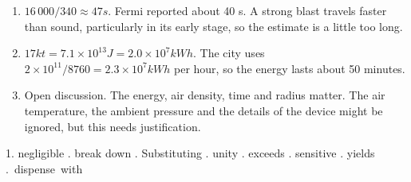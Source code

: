 \documentclass[11pt,a4paper]{article}
\begin{document}
\clearpage
{}

\begin{enumerate}[label=\textbf{\arabic*.}]
  \item $16\,000/340\approx47\unit{s}$. Fermi reported about 40 s. A strong blast travels faster than sound, particularly in its early stage, so the estimate is a little too long.\\
  \item $17\unit{kt}=7.1\times10^{13}\unit{J}=2.0\times10^{7}\unit{kWh}$. The city uses $2\times10^{11}/8760=2.3\times10^{7}\unit{kWh}$ per hour, so the energy lasts about 50 minutes.
  \item Open discussion. The energy, air density, time and radius matter. The air temperature, the ambient pressure and the details of the device might be ignored, but this needs justification.
\end{enumerate}

1. negligible . break down . Substituting . unity . exceeds . sensitive . yields .~dispense~with
\end{document}
